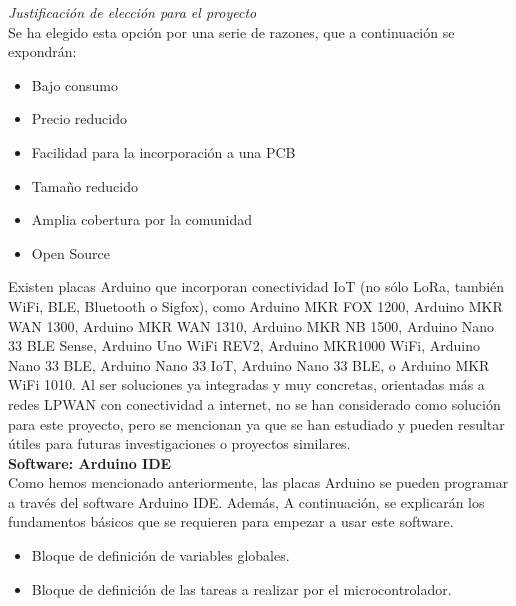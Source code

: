 \documentclass[12pt]{article}
\begin{document}
	\noindent \textit{Justificación de elección para el proyecto} \\
	
	\noindent Se ha elegido esta opción por una serie de razones, que a continuación se expondrán: \\
	
	\begin{itemize}
		\item Bajo consumo
		\item Precio reducido
		\item Facilidad para la incorporación a una PCB
		\item Tamaño reducido
		\item Amplia cobertura por la comunidad
		\item Open Source
	\end{itemize}
	

	\noindent Existen placas Arduino que incorporan conectividad IoT (no sólo LoRa, también WiFi, BLE, Bluetooth o Sigfox), como Arduino MKR FOX 1200, Arduino MKR WAN 1300, Arduino MKR WAN 1310, Arduino MKR NB 1500, Arduino Nano 33 BLE Sense, Arduino Uno WiFi REV2, Arduino MKR1000 WiFi, Arduino Nano 33 BLE, Arduino Nano 33 IoT, Arduino Nano 33 BLE, o Arduino MKR WiFi 1010.  Al ser soluciones ya integradas y muy concretas, orientadas más a redes LPWAN con conectividad a internet, no se han considerado como solución para este proyecto, pero se mencionan ya que se han estudiado y pueden resultar útiles para futuras investigaciones o proyectos similares.\\
	
	
	\noindent \textbf{Software: Arduino IDE} \\
	
	
	\noindent Como hemos mencionado anteriormente, las placas Arduino se pueden programar a través del software Arduino IDE. Además, A continuación, se explicarán los fundamentos básicos que se requieren para empezar a usar este software. \\
	
	\begin{itemize}
		\item Bloque de definición de variables globales.
		\item Bloque de definición de las tareas a realizar por el microcontrolador.
	\end{itemize}
	
\end{document}
